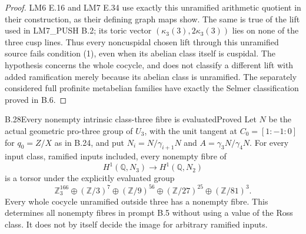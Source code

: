 \begin{proof}
LM6 E.16 and LM7 E.34 use exactly this
unramified arithmetic quotient in their
construction, as their defining graph maps
show. The same is true of the lift used in
LM7\_PUSH B.2; its toric vector
$(\kappa_3(3),2\kappa_3(3))$ lies on none
of the three cusp lines.
Thus every noncuspidal chosen lift through this
unramified source fails condition (1), even when
its abelian class itself is cuspidal. The
hypothesis concerns the whole cocycle, and
does not classify a different lift with added
ramification merely because its abelian class
is unramified.
The separately considered full profinite
metabelian families have exactly the Selmer
classification proved in B.6.
\end{proof}

\begin{statement}{B.28}{Every nonempty intrinsic class-three fibre is evaluated}{Proved}
Let $N$ be the actual geometric pro-three group of $U_3$,
with the unit tangent at $C_0=[1:-1:0]$ for $q_0=Z/X$
as in B.24, and put
$N_i=N/\gamma_{i+1}N$ and $A=\gamma_3N/\gamma_4N$.
For every input class, ramified inputs included, every
nonempty fibre of
\[
 H^1(\mathbb Q,N_3)\longrightarrow H^1(\mathbb Q,N_2)
                                                               \tag{B.28.1}
\]
is a torsor under the explicitly evaluated group
\[
 \mathbb Z_3^{166}\oplus(\mathbb Z/3)^7
 \oplus(\mathbb Z/9)^{56}\oplus(\mathbb Z/27)^{25}
 \oplus(\mathbb Z/81)^3 .                                      \tag{B.28.2}
\]
Every whole cocycle unramified outside three has a nonempty
fibre. This determines all nonempty fibres in prompt B.5
without using a value of the Ross class. It does not by
itself decide the image for arbitrary ramified inputs.
\end{statement}
